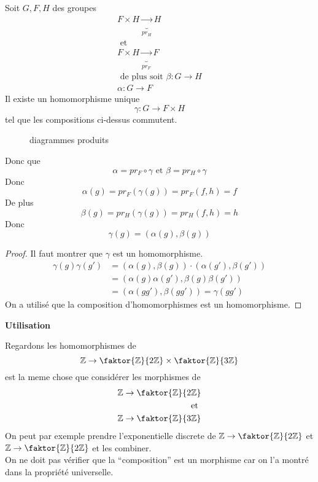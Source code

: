 \documentclass[../main.tex]{subfiles}
\begin{document}
\begin{propo}
Soit $G,F,H$ des groupes
\begin{align*}
F\times H \underbrace{\to}_{pr_H} H  \\
\text{ et } \\
F\times H \underbrace{\to}_{pr_F} F\\
\text{ de plus soit } 
\beta: G \to H\\
\alpha: G \to F
\end{align*}
Il existe un homomorphisme unique
\[ 
\gamma : G \to F\times H 
\]
tel que les compositions ci-dessus commutent.
\begin{figure}[H]
    \centering
    \caption{diagrammes produits}
    \label{fig:diagrammes-produits}
\end{figure}
Donc que
\[ 
\alpha = pr_F \circ \gamma \text{ et } \beta = pr_H \circ \gamma
\]
Donc
\[ 
	\alpha ( g) = pr_F ( \gamma ( g) ) = pr_F( f,h) =f
\]
De plus 
\[ 
	\beta ( g)  = pr_H ( \gamma( g) ) = pr_H ( f,h)  =h
\]
Donc
\[ 
	\gamma ( g) = ( \alpha( g) , \beta( g) ) 
\]
\end{propo}
\begin{proof}
Il faut montrer que $\gamma$ est un homomorphisme.\\
\begin{align*}
	\gamma( g) \gamma( g')  &= ( \alpha( g) ,\beta( g) ) \cdot ( \alpha( g') , \beta( g') ) \\
		     &= ( \alpha( g) \alpha( g') , \beta( g) \beta( g')  )\\
		     &= ( \alpha( gg') ,\beta( gg') ) = \gamma( gg')
\end{align*}
On a utilisé que la composition d'homomorphismes est un homomorphisme.
\end{proof}
\begin{center}
\textbf{Utilisation}
\end{center}
Regardons les homomorphismes de
\[ 
	\mathbb{Z}\to \faktor{\mathbb{Z}}{2\mathbb{Z}} \times \faktor { \mathbb{Z} } {3\mathbb{Z}} 
\]
est la meme chose que considérer les morphismes de 
\begin{align*}
	\mathbb{Z} \to \faktor{\mathbb{Z}}{2\mathbb{Z}}\\
	\text{ et } \\
	\mathbb{Z}\to \faktor{\mathbb{Z}}{3\mathbb{Z}}
\end{align*}
On peut par exemple prendre l'exponentielle discrete de $\mathbb{Z}\to \faktor{\mathbb{Z}}{2\mathbb{Z}}$ et 
$\mathbb{Z}\to \faktor{\mathbb{Z}}{2\mathbb{Z}}$
et les combiner.\\
On ne doit pas vérifier que la ``composition''  est un morphisme car on l'a montré dans la propriété universelle.
\end{document}
